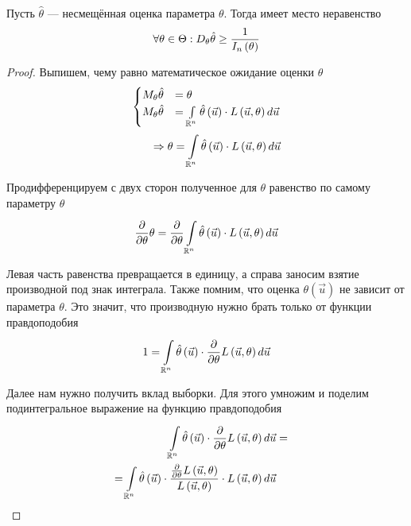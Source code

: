 \begin{theorem}
    Пусть $\hat{\theta}$ --- несмещённая оценка параметра $\theta$.
    Тогда имеет место неравенство
    $$\forall\theta\in\Theta:
        \dispersionof{\theta}{\hat{\theta}}
        \ge\frac{1}{I_n\left(\theta\right)}$$
\end{theorem}
\begin{proof}
    Выпишем, чему равно математическое ожидание оценки $\theta$
    \begin{align*}
        \begin{cases}
        \meanof{\theta}{\hat{\theta}}
            &=\theta\\
        \meanof{\theta}{\hat{\theta}}
            &=\integral{\mathbb{R}^n}{}{\vec{u}}{
                \hat{\theta}\left( \vec{u} \right)
                    \cdot L\left( \vec{u},\theta \right)}
        \end{cases}\\
        \Rightarrow
        \theta=\integral{\mathbb{R}^n}{}{\vec{u}}{
                \hat{\theta}\left( \vec{u} \right)
                    \cdot L\left( \vec{u},\theta \right)}
    \end{align*}

    Продифференцируем с двух сторон полученное для $\theta$ равенство
    по самому параметру $\theta$
    $$\frac{\partial}{\partial \theta}\theta
        =\frac{\partial}{\partial \theta}\integral{\mathbb{R}^n}{}{\vec{u}}{
                \hat{\theta}\left( \vec{u} \right)
                    \cdot L\left( \vec{u},\theta \right)}$$

    Левая часть равенства превращается в единицу,
    а справа заносим взятие производной под знак интеграла.
    Также помним, что оценка $\theta\left( \vec{u} \right)$
    не зависит от параметра $\theta$.
    Это значит, что производную нужно брать только от функции правдоподобия
    $$1=\integral{\mathbb{R}^n}{}{\vec{u}}{\hat{\theta}\left( \vec{u} \right)
        \cdot \frac{\partial}{\partial \theta}L\left( \vec{u},\theta \right)}$$

    Далее нам нужно получить вклад выборки.
    Для этого умножим и поделим подинтегральное выражение
    на функцию правдоподобия
    \begin{align*}
    \integral{\mathbb{R}^n}{}{\vec{u}}{\hat{\theta}\left( \vec{u} \right)
        \cdot \frac{\partial}{\partial \theta}L\left( \vec{u},\theta \right)}&=& \\
    =\integral{\mathbb{R}^n}{}{\vec{u}}{\hat{\theta}\left( \vec{u} \right)
        \cdot \frac{
            \frac{\partial}{\partial \theta}L\left( \vec{u},\theta \right)}
            {L\left( \vec{u},\theta \right)}
                \cdot L\left( \vec{u},\theta \right)}
    \end{align*}


\end{proof}
